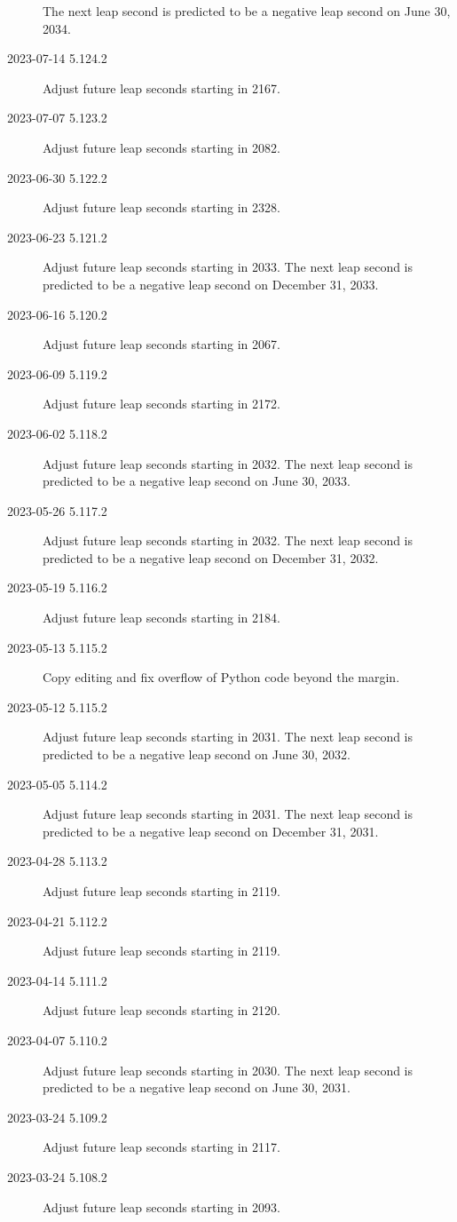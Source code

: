 \documentclass[letterpaper,twoside]{article}
\begin{document}
\begin{description}
  The next leap second is predicted to be a negative leap second
  on June 30, 2034.
\item[2023-07-14 5.124.2]Adjust future leap seconds starting in 2167.
\item[2023-07-07 5.123.2]Adjust future leap seconds starting in 2082.
\item[2023-06-30 5.122.2]Adjust future leap seconds starting in 2328.
\item[2023-06-23 5.121.2]Adjust future leap seconds starting in 2033.
  The next leap second is predicted to be a negative leap second
  on December 31, 2033.
\item[2023-06-16 5.120.2]Adjust future leap seconds starting in 2067.
\item[2023-06-09 5.119.2]Adjust future leap seconds starting in 2172.
\item[2023-06-02 5.118.2]Adjust future leap seconds starting in 2032.
  The next leap second is predicted to be a negative leap second
  on June 30, 2033.
\item[2023-05-26 5.117.2]Adjust future leap seconds starting in 2032.
  The next leap second is predicted to be a negative leap second
  on December 31, 2032.
\item[2023-05-19 5.116.2]Adjust future leap seconds starting in 2184.
\item[2023-05-13 5.115.2]Copy editing and fix overflow of Python code
  beyond the margin.
\item[2023-05-12 5.115.2]Adjust future leap seconds starting in 2031.
  The next leap second is predicted to be a negative leap second
  on June 30, 2032.
\item[2023-05-05 5.114.2]Adjust future leap seconds starting in 2031.
  The next leap second is predicted to be a negative leap second
  on December 31, 2031.
\item[2023-04-28 5.113.2]Adjust future leap seconds starting in 2119.
\item[2023-04-21 5.112.2]Adjust future leap seconds starting in 2119.
\item[2023-04-14 5.111.2]Adjust future leap seconds starting in 2120.
\item[2023-04-07 5.110.2]Adjust future leap seconds starting in 2030.
  The next leap second is predicted to be a negative leap second
  on June 30, 2031.
\item[2023-03-24 5.109.2]Adjust future leap seconds starting in 2117.
\item[2023-03-24 5.108.2]Adjust future leap seconds starting in 2093.

\end{description}
\end{document}
